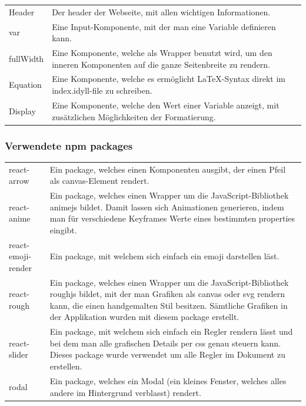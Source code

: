 \documentclass[a4paper,10.2pt,pdftex]{scrartcl}%
\begin{document}
\begin{tabularx}{\textwidth}{p{2.5cm}p{8.5cm}}
Header & Der header der Webseite, mit allen wichtigen Informationen.\\
var & Eine Input-Komponente, mit der man eine Variable definieren kann. \\
fullWidth & Eine Komponente, welche als Wrapper benutzt wird, um den inneren Komponenten auf die ganze Seitenbreite zu rendern. \\
Equation & Eine Komponente, welche es ermöglicht LaTeX-Syntax direkt im index.idyll-file zu schreiben. \\
Display & Eine Komponente, welche den Wert einer Variable anzeigt, mit zusätzlichen Möglichkeiten der Formatierung.
\end{tabularx}

\subsubsection{Verwendete npm packages}
\begin{tabularx}{\textwidth}{p{3cm}p{8.5cm}}
react-arrow &  Ein package, welches einen Komponenten ausgibt, der einen Pfeil als canvas-Element rendert. \\
react-anime &  Ein package, welches einen Wrapper um die JavaScript-Bibliothek animejs bildet. Damit lassen sich Animationen generieren, indem man für verschiedene Keyframes Werte eines bestimmten properties eingibt. \\
react-emoji-render &  Ein package, mit welchem sich einfach ein emoji darstellen läst. \\
react-rough &  Ein package, welches einen Wrapper um die JavaScript-Bibliothek roughjs bildet, mit der man Grafiken als canvas oder svg rendern kann, die einen handgemalten Stil besitzen. Sämtliche Grafiken in der Applikation wurden mit diesem package erstellt. \\
react-slider&  Ein package, mit welchem sich einfach ein Regler rendern lässt und bei dem man alle grafischen  Details per css genau steuern kann. Dieses package wurde verwendet um alle Regler im Dokument zu erstellen. \\
rodal&  Ein package, welches ein Modal (ein kleines Fenster, welches alles andere im Hintergrund verblasst)  rendert.

\end{tabularx}
\end{document}
